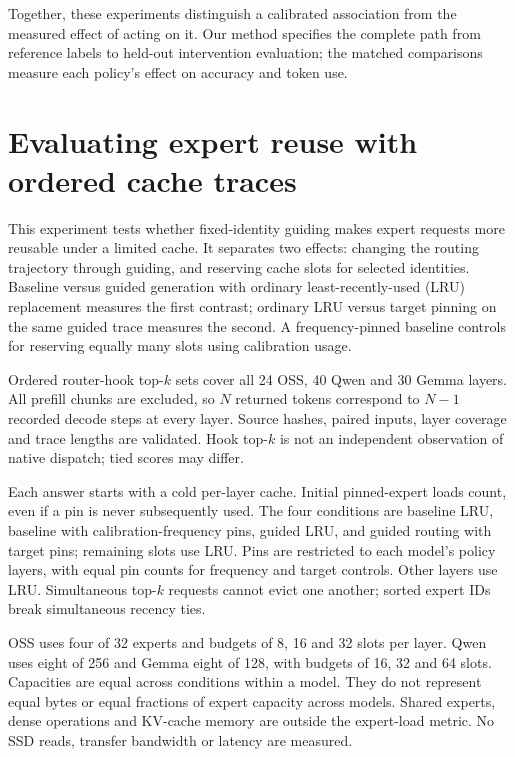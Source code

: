 \documentclass[12pt,a4paper,twoside,openright]{book}
\begin{document}
Together, these experiments distinguish a calibrated association from the
measured effect of acting on it. Our method specifies the complete path from
reference labels to held-out intervention evaluation; the matched comparisons
measure each policy's effect on accuracy and token use.

\section{Evaluating expert reuse with ordered cache traces}
\label{sec:method-cache}

This experiment tests whether fixed-identity guiding makes expert requests
more reusable under a limited cache. It separates two effects: changing the
routing trajectory through guiding, and reserving cache slots for selected
identities. Baseline versus guided generation with ordinary least-recently-used
(LRU) replacement measures the first contrast; ordinary LRU versus target
pinning on the same guided trace measures the second. A frequency-pinned
baseline controls for reserving equally many slots using calibration usage.

Ordered router-hook top-$k$ sets cover all 24 OSS, 40 Qwen and 30 Gemma
layers. All prefill chunks are excluded, so $N$ returned tokens correspond
to $N-1$ recorded decode steps at every layer. Source hashes, paired inputs,
layer coverage and trace lengths are validated. Hook top-$k$ is not an
independent observation of native dispatch; tied scores may differ.

Each answer starts with a cold per-layer cache. Initial pinned-expert loads
count, even if a pin is never subsequently used. The four conditions are
baseline LRU, baseline with calibration-frequency pins, guided LRU, and
guided routing with target pins; remaining slots use LRU. Pins are restricted
to each model's policy layers, with equal pin counts for frequency and target
controls. Other layers use LRU. Simultaneous top-$k$ requests cannot evict
one another; sorted expert IDs break simultaneous recency ties.

OSS uses four of 32 experts and budgets of 8, 16 and 32 slots per layer.
Qwen uses eight of 256 and Gemma eight of 128, with budgets of 16, 32 and
64 slots. Capacities are equal across conditions within a model. They do
not represent equal bytes or equal fractions of expert capacity across
models. Shared experts, dense operations and KV-cache memory are outside
the expert-load metric. No SSD reads, transfer bandwidth or latency are measured.
\end{document}

